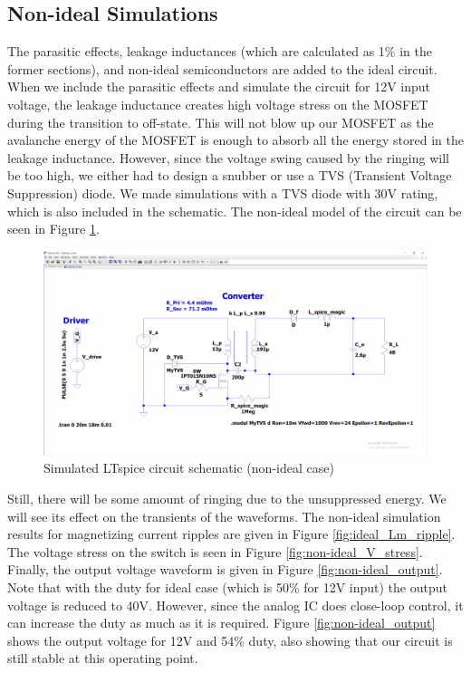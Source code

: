 \documentclass[12pt]{article}
\begin{document}
    \subsection{Non-ideal Simulations}
    The parasitic effects, leakage inductances (which are calculated as 1\% in the former sections), and non-ideal semiconductors are added to the ideal circuit. When we include the parasitic effects and simulate the circuit for 12V input voltage, the leakage inductance creates high voltage stress on the MOSFET during the transition to off-state. This will not blow up our MOSFET as the avalanche energy of the MOSFET is enough to absorb all the energy stored in the leakage inductance. However, since the voltage swing caused by the ringing will be too high, we either had to design a snubber or use a TVS (Transient Voltage Suppression) diode. We made simulations with a TVS diode with 30V rating, which is also included in the schematic. The non-ideal model of the circuit can be seen in Figure \ref{fig:non-ideal_sim_circuit}. \\

    \begin{figure}[H]
        \centering
        \includegraphics[scale=0.3]{img/Spice_Sim/Non-ideal/non-ideal_simulation_circuit.PNG}
        \caption{Simulated LTspice circuit schematic (non-ideal case)}
        \label{fig:non-ideal_sim_circuit}
    \end{figure}

    Still, there will be some amount of ringing due to the unsuppressed energy. We will see its effect on the transients of the waveforms. The non-ideal simulation results for magnetizing current ripples are given in Figure \ref{fig:ideal_Lm_ripple}. The voltage stress on the switch is seen in Figure \ref{fig:non-ideal_V_stress}. Finally, the output voltage waveform is given in Figure \ref{fig:non-ideal_output}. Note that with the duty for ideal case (which is 50\% for 12V input) the output voltage is reduced to 40V. However, since the analog IC does close-loop control, it can increase the duty as much as it is required. Figure \ref{fig:non-ideal_output} shows the output voltage for 12V and 54\% duty, also showing that our circuit is still stable at this operating point.\\
\end{document}
